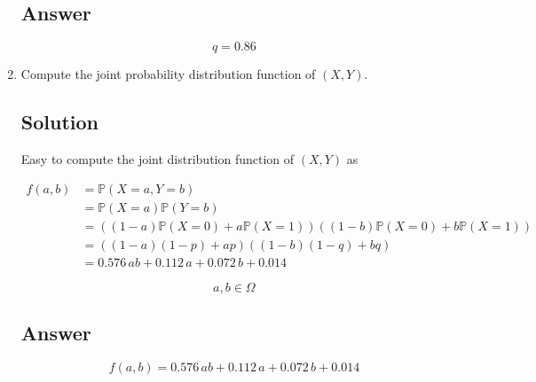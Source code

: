 \documentclass[12pt]{article}
\newcommand{\bP}{\mathbb{P}}
\begin{document}
\begin{enumerate}[start=1,label={\bfseries Part \arabic*:},leftmargin=0in]
		\subsection*{Answer}
		
			\[\boxed{q = 0.86}\]
			
		\bigskip\item Compute the joint probability distribution function of $(X,Y)$.
		
		\subsection*{Solution}
		
			Easy to compute the joint distribution function of $(X,Y)$ as
		
			\[
			\begin{aligned}
				f(a,b) &= \bP(X=a,Y=b)\\
				&= \bP(X=a)\bP(Y=b)\\
				&= ((1-a)\bP(X=0) + a\bP(X=1))((1-b)\bP(X=0) + b\bP(X=1))\\
				&= ((1-a)(1-p) + ap)((1-b)(1-q) + bq)\\
				&= 0.576\,ab + 0.112\,a + 0.072\,b + 0.014
			\end{aligned}
			\]
			
			\[a,b\in \Omega\]
		
		\subsection*{Answer}
		
			\[\boxed{f(a,b) = 0.576\,ab + 0.112\,a + 0.072\,b + 0.014}\]
	\end{enumerate}
	
\end{document}
